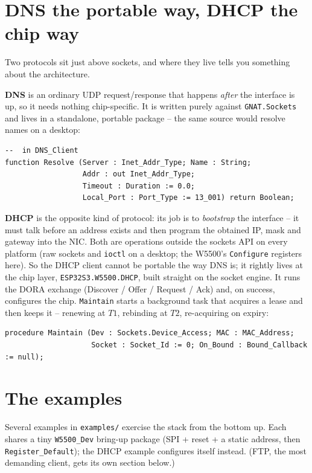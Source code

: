 \section{DNS the portable way, DHCP the chip way}
\label{ch:net:dns-dhcp}

Two protocols sit just above sockets, and where they live tells you something about
the architecture.

\textbf{DNS} is an ordinary UDP request/response that happens \emph{after} the
interface is up, so it needs nothing chip-specific. It is written purely against
\texttt{GNAT.Sockets} and lives in a standalone, portable package -- the same
source would resolve names on a desktop:

\begin{lstlisting}
--  in DNS_Client
function Resolve (Server : Inet_Addr_Type; Name : String;
                  Addr : out Inet_Addr_Type;
                  Timeout : Duration := 0.0;
                  Local_Port : Port_Type := 13_001) return Boolean;
\end{lstlisting}

\textbf{DHCP} is the opposite kind of protocol: its job is to \emph{bootstrap} the
interface -- it must talk before an address exists and then program the obtained
IP, mask and gateway into the NIC. Both are operations outside the sockets API on
every platform (raw sockets and \texttt{ioctl} on a desktop; the W5500's
\texttt{Configure} registers here). So the DHCP client cannot be portable the way
DNS is; it rightly lives at the chip layer, \texttt{ESP32S3.W5500.DHCP}, built
straight on the socket engine. It runs the DORA exchange (Discover / Offer /
Request / Ack) and, on success, configures the chip. \texttt{Maintain} starts a
background task that acquires a lease and then keeps it -- renewing at $T1$,
rebinding at $T2$, re-acquiring on expiry:

\begin{lstlisting}
procedure Maintain (Dev : Sockets.Device_Access; MAC : MAC_Address;
                    Socket : Socket_Id := 0; On_Bound : Bound_Callback := null);
\end{lstlisting}

\section{The examples}
\label{ch:net:examples}

Several examples in \texttt{examples/} exercise the stack from the bottom up. Each
shares a tiny \texttt{W5500\_Dev} bring-up package (SPI + reset + a static address,
then \texttt{Register\_Default}); the DHCP example configures itself instead. (FTP,
the most demanding client, gets its own section below.)

